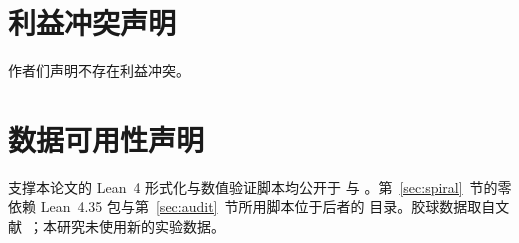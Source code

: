 \documentclass[aps,prd,preprint,superscriptaddress,amsmath,amssymb]{revtex4-2}
\begin{document}
\section*{利益冲突声明}
作者们声明不存在利益冲突。

\section*{数据可用性声明}
支撑本论文的 Lean~4 形式化与数值验证脚本均公开于
 与
。第~\ref{sec:spiral}~节的零依赖 Lean~4.35 包与第~\ref{sec:audit}~节所用脚本位于后者的  目录。胶球数据取自文献~\cite{athenodorou2020glueball}；本研究未使用新的实验数据。


\end{document}
